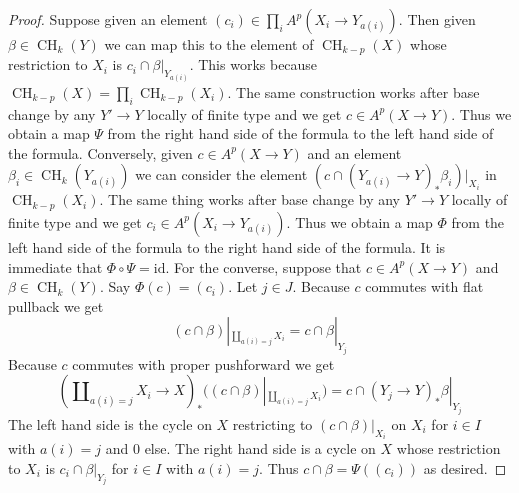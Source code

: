\documentclass[10pt,a4paper]{amsart}
\theoremstyle{plain}
\theoremstyle{definition}
\theoremstyle{remark}
\numberwithin{equation}{subsection}
\def\CH{\mathop{\mathrm{CH}}\nolimits}
\begin{document}
\begin{proof}
Suppose given an element $(c_i) \in \prod_i A^p(X_i \to Y_{a(i)})$.
Then given $\beta \in \CH_k(Y)$ we can map this to the element of
$\CH_{k - p}(X)$ whose restriction to $X_i$ is $c_i \cap \beta|_{Y_{a(i)}}$.
This works because $\CH_{k - p}(X) = \prod_i \CH_{k - p}(X_i)$.
The same construction works after base change by any $Y' \to Y$
locally of finite type and we get $c \in A^p(X \to Y)$.
Thus we obtain a map $\Psi$ from the right hand side of the formula
to the left hand side of the formula.
Conversely, given $c \in A^p(X \to Y)$ and an element
$\beta_i \in \CH_k(Y_{a(i)})$ we can consider the element
$(c \cap (Y_{a(i)} \to Y)_*\beta_i)|_{X_i}$ in $\CH_{k - p}(X_i)$.
The same thing works after base change by any $Y' \to Y$
locally of finite type and we get $c_i \in A^p(X_i \to Y_{a(i)})$.
Thus we obtain a map $\Phi$ from the left hand
side of the formula to the right hand side of the formula.
It is immediate that $\Phi \circ \Psi = \text{id}$.
For the converse, suppose that $c \in A^p(X \to Y)$ and
$\beta \in \CH_k(Y)$. Say $\Phi(c) = (c_i)$. Let $j \in J$.
Because $c$ commutes with flat pullback we get
$$
(c \cap \beta)|_{\coprod_{a(i) = j} X_i} =
c \cap \beta|_{Y_j}
$$
Because $c$ commutes with proper pushforward we get
$$
(\coprod\nolimits_{a(i) = j} X_i \to X)_*
((c \cap \beta)|_{\coprod_{a(i) = j} X_i})
=
c \cap (Y_j \to Y)_*\beta|_{Y_j}
$$
The left hand side is the cycle on $X$ restricting to $(c \cap \beta)|_{X_i}$
on $X_i$ for $i \in I$ with $a(i) = j$ and $0$ else.
The right hand side is a cycle on $X$ whose restriction to $X_i$
is $c_i \cap \beta|_{Y_j}$ for $i \in I$ with $a(i) = j$.
Thus $c \cap \beta = \Psi((c_i))$ as desired.
\end{proof}
\end{document}
